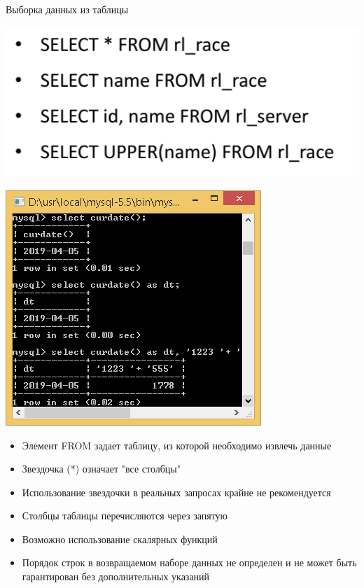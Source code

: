 \documentclass{beamer}
\begin{document}
\begin{frame}{Выборка данных из таблицы}
	\begin{minipage}{0.4\textwidth}
		\begin{flushleft}
			\begin{center}
				\includegraphics[scale=0.4]{images/SQL-01a.png}
		  	\end{center}
			\begin{center}
				\includegraphics[scale=0.2]{images/SQL-01.png}
		  	\end{center}
	  	\end{flushleft}  	
	\end{minipage}
	\begin{minipage}{0.5\textwidth}
		\begin{flushright}
			\begin{itemize}
				\item Элемент FROM задает таблицу, из которой необходимо извлечь данные
				\item Звездочка (*) означает "все столбцы"
				\item Использование звездочки в реальных запросах крайне не рекомендуется
				\item Столбцы таблицы перечисляются через запятую
				\item Возможно использование скалярных функций
				\item Порядок строк в возвращаемом наборе данных не определен и не может быть гарантирован без дополнительных указаний
			\end{itemize}
		\end{flushright}
	\end{minipage}
\end{frame}
\end{document}
